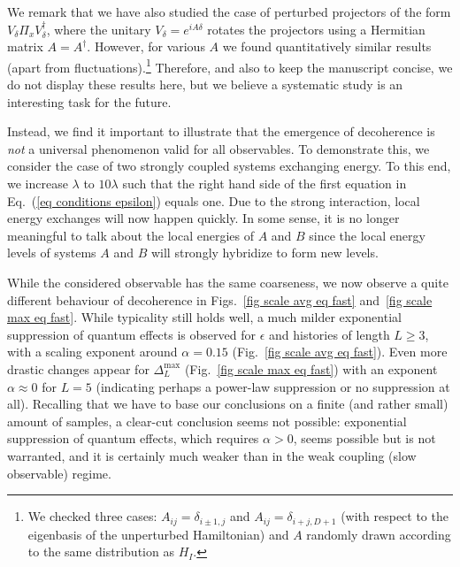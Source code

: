 \documentclass[pre,twocolumn,10pt,aps,longbibliography,nofootinbib]{revtex4-1}
\newcommand{\blue}[1]{#1}
\newcommand{\new}[1]{#1}
\begin{document}
\new{We remark that we have also studied the case of perturbed projectors of the form $V_\delta \Pi_x V_\delta^\dagger$, where the unitary $V_\delta = e^{iA\delta}$ rotates the projectors using a Hermitian matrix $A = A^\dagger$. However, for various $A$ we found quantitatively similar results (apart from fluctuations).\footnote{\new{We checked three cases: $A_{ij} = \delta_{i\pm1,j}$ and $A_{ij} = \delta_{i+j,D+1}$ (with respect to the eigenbasis of the unperturbed Hamiltonian) and $A$ randomly drawn according to the same distribution as $H_I$.}} Therefore, and also to keep the manuscript concise, we do not display these results here, but we believe a systematic study is an interesting task for the future.}

\new{Instead, we find it important to illustrate that} the emergence of \new{decoherence} is \emph{not} a universal phenomenon valid for all observables. To demonstrate this, we consider the case of two strongly coupled systems exchanging energy. To this end, we increase $\lambda$ to $10\lambda$ such that the right hand side of the first equation in Eq.~(\ref{eq conditions epsilon}) equals one. Due to the strong interaction, local energy exchanges will now happen quickly. In some sense, it is no longer meaningful to talk about the local energies of $A$ and $B$ since the local energy levels of systems $A$ and $B$ will strongly hybridize to form new levels.

\blue{While the considered observable has the same coarseness, we now observe a quite} different behaviour of \new{decoherence} in Figs.~\ref{fig scale avg eq fast} and~\ref{fig scale max eq fast}. While typicality still holds well, \blue{a much milder exponential suppression of quantum effects is observed for $\epsilon$ and} histories of length $L\ge3$, \blue{with a} scaling exponent around $\alpha = 0.15$ (Fig.~\ref{fig scale avg eq fast}). \blue{Even more drastic changes appear for $\Delta_L^\text{max}$ (Fig.~\ref{fig scale max eq fast}) with an exponent $\alpha\approx 0$ for $L=5$ (indicating perhaps a power-law suppression or no suppression at all)}. Recalling that we have to base our conclusions on a finite (and rather small) amount of samples, a clear-cut conclusion seems not possible: exponential suppression of quantum effects, which requires $\alpha>0$, seems possible but is not warranted, and it is certainly much weaker than in the weak coupling (slow observable) regime.
\end{document}
